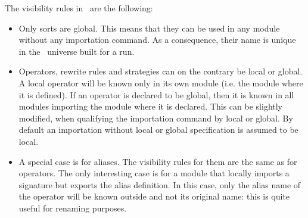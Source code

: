 The visibility rules in \elan\ are the following:
\begin{itemize}
\item Only sorts are global. This means that they can be used in any
        module without any importation command. As a consequence,
        their name is unique in the \elan\ universe built for a run.
\item Operators,  rewrite rules and strategies can  on the contrary be
        local or global.  A local  operator will be  known only in its
        own module  (i.e.   the module where it  is   defined). If  an
        operator is declared to  be global, then   it is known  in all
        modules importing the module where it is declared. This can be
        slightly modified, when qualifying  the importation command by
        local  or global. By default an  importation  without local or
        global specification is assumed to be local.
\item A special case is for aliases. The visibility rules for them are
        the same as for operators. The only interesting case is for a
        module that locally imports a signature but exports the alias
        definition. In this case, only the alias name of the operator
        will be known outside and not its original name: this is quite
        useful for renaming purposes.
\end{itemize}




